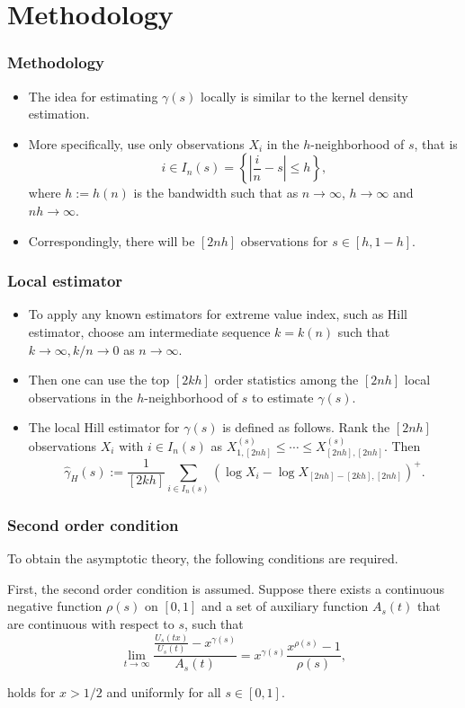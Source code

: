 \documentclass{beamer}
\newcommand{\abs}[1]{\left\vert#1\right\vert}
\newcommand{\set}[1]{\left\{#1\right\}}
\begin{document}
\section{Methodology}

\begin{frame}
    \frametitle{Methodology}
\begin{itemize}
    \item The idea for estimating $\gamma(s)$ locally is similar to the kernel density estimation.
    \medskip
    \item More specifically, use only observations $X_i$ in the $h$-neighborhood of $s$, that is 
    $$
i\in I_n(s)=\set{\abs{\frac{i}{n}-s}\le h},
    $$
    where $h:=h(n)$ is the bandwidth such that as $n\to \infty$, $h \to \infty$ and $nh\to \infty$.
    \medskip
\item Correspondingly, there will be $[2nh]$ observations for $s\in [h,1-h]$.
\end{itemize}
\end{frame}

\begin{frame}
    \frametitle{Local estimator}
\begin{itemize}
    \item To apply any known estimators for extreme value index, such as Hill estimator, choose am intermediate sequence $k=k(n)$ such that $k\to \infty, k/n \to 0$ as $n \to \infty$.
    \item Then one can use the top $[2kh]$ order statistics among the $[2nh]$ local observations in the $h$-neighborhood of $s$ to estimate $\gamma(s)$.
    \item The local Hill estimator for $\gamma(s)$ is defined as follows. Rank the $[2nh]$ observations $X_i$ with $i \in I_n(s)$ as $X_{1,[2nh]}^{(s)}\le \cdots \le X_{[2nh],[2nh]}^{(s)}$. Then
    $$
    \hat{\gamma}_{H}(s):=\frac{1}{[2 k h]} \sum_{i \in I_{n}(s)}\left(\log X_{i}-\log X_{[2 n h]-[2 k h],[2 n h]}\right)^{+}.
    $$
\end{itemize}
\end{frame}







\begin{frame} 
    \frametitle{Second order condition}
To obtain the asymptotic theory, the following conditions are required.
   
\bigskip

First, the second order condition is assumed. Suppose there exists a continuous negative function $\rho(s)$ on $[0,1]$ and a set of auxiliary function $A_s(t)$ that are continuous with respect to $s$, such that
\begin{equation}\tag{3}
    \lim _{t \rightarrow \infty} \frac{\frac{U_{s}(t x)}{U_{s}(t)}-x^{\gamma(s)}}{A_{s}(t)}=x^{\gamma(s)} \frac{x^{\rho(s)}-1}{\rho(s)},   
\end{equation}


holds for $x>1/2$ and uniformly for all $s\in [0,1]$. 
\end{frame}
\end{document}
